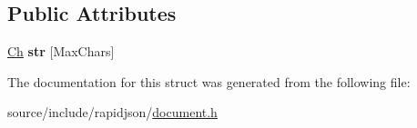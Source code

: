 \subsection*{Public Attributes}
\begin{DoxyCompactItemize}
\item 
\hypertarget{struct_generic_value_1_1_short_string_a444e24523d4cc33830d18a2cfcfd333b}{}\hyperlink{class_generic_value_ade0e0ce64ccd5d852da57a35e720bafb}{Ch} {\bfseries str} \mbox{[}Max\+Chars\mbox{]}\label{struct_generic_value_1_1_short_string_a444e24523d4cc33830d18a2cfcfd333b}

\end{DoxyCompactItemize}


The documentation for this struct was generated from the following file\+:\begin{DoxyCompactItemize}
\item 
source/include/rapidjson/\hyperlink{document_8h}{document.\+h}\end{DoxyCompactItemize}
